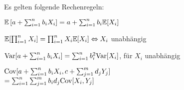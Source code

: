 \begin{note}

	Es gelten folgende Rechenregeln:
	\begin{compactenum}[i:]

		\item \(\mathbb{E}\left[a+\sum_{i=1}^n b_i X_i\right]=a + \sum_{i=1}^n b_i \mathbb{E}[X_i]\)

		\item \(\mathbb{E}[\prod_{i=1}^n X_i] = \prod_{i=1}^n X_i \mathbb{E}[X_i] \Leftrightarrow X_i\) unabhängig

		\item \(\mathrm{Var}[a+\sum_{i=1}^n b_iX_i] = \sum_{i=1}^n b_i^2 \mathrm{Var}[X_i]\), für \(X_i\) unabhängig

		\item \(\mathrm{Cov}[a+\sum_{i=1}^n b_iX_i,c+\sum_{j=1}^m d_jY_j]\) \\
		\(=\sum_{i=1}^n\sum_{j=1}^m b_i d_j \mathrm{Cov}[X_i,Y_j]\)

	\end{compactenum}
\end{note}


